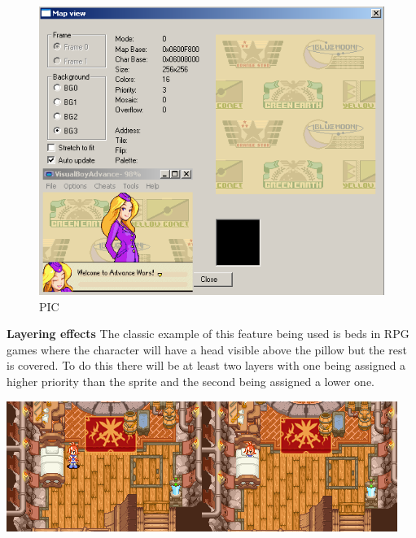 \documentclass[
]{book}
\begin{document}
\begin{figure}
\centering
\includegraphics{images/36_home_fast6191_romhackingguide_unrenamed_file___inal_borders_romhackingguide2dBGscrolling_2.png}
\caption{PIC}
\end{figure}

\textbf{Layering effects} The classic example of this feature being used is beds in RPG games where the character will have a head visible above the pillow but the rest is covered. To do this there will be at least two layers with one being assigned a higher priority than the sprite and the second being assigned a lower one.

\includegraphics{images/37_home_fast6191_romhackingguide_unrenamed_file___original_borders_romhackingguideBGlayering1.png}\includegraphics{images/38_home_fast6191_romhackingguide_unrenamed_file___original_borders_romhackingguideBGlayering2.png}
\end{document}
